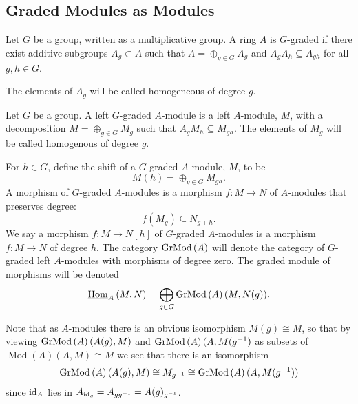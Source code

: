 \documentclass[dissertation.tex]{subfiles}
\begin{document}
\subsection{Graded Modules as Modules}

\begin{defn}
  Let $G$ be a group, written as a multiplicative group.
  A ring $A$ is $G$-graded if there exist additive subgroups $A_g \subset A$ such that $A = \oplus_{g \in G} A_g$ and $A_gA_h \subseteq A_{gh}$ for all $g,h \in G$.
  
  The elements of $A_g$ will be called homogeneous of degree $g$.
\end{defn}

\begin{defn}
  Let $G$ be a group.
  A left $G$-graded $A$-module is a left $A$-module, $M$, with a decomposition $M = \oplus_{g \in G} M_g$ such that $A_gM_h \subseteq M_{gh}$.
  The elements of $M_g$ will be called homogenous of degree $g$.
  
  For $h \in G$, define the shift of a $G$-graded $A$-module, $M$, to be
  $$M(h) = \oplus_{g \in G} M_{gh}.$$
  A morphism of $G$-graded $A$-modules is a morphism $f \colon M \to N$ of $A$-modules that preserves degree:
  $$f(M_g) \subseteq N_{g+h}.$$
  We say a morphism $f \colon M \to N[h]$ of $G$-graded $A$-modules is a morphism $f \colon M \to N$ of degree $h$.
  The category $\operatorname{GrMod}\left(A\right)$ will denote the category of $G$-graded left $A$-modules with morphisms of degree zero.
  The graded module of morphisms will be denoted
  $$\operatorname{\underline{Hom}}_{A}\left(M,N\right) = \bigoplus_{g \in G}\operatorname{GrMod}\left(A\right)(M,N(g)).$$
\end{defn}

\begin{rmk}
  Note that as $A$-modules there is an obvious isomorphism $M(g) \cong M$, so that by viewing $\operatorname{GrMod}\left(A\right)(A(g), M)$ and $\operatorname{GrMod}\left(A\right)(A, M(g^{-1})$ as subsets of $\operatorname{Mod}(A)(A, M) \cong M$ we see that there is an isomorphism
$$\operatorname{GrMod}\left(A\right)(A(g), M) \cong M_{g^{-1}} \cong \operatorname{GrMod}\left(A\right)(A,M(g^{-1}))$$
  since $\operatorname{id}_A$ lies in $A_{\operatorname{id}_g} = A_{gg^{-1}} = A(g)_{g^{-1}}$.
\end{rmk}
\end{document}
